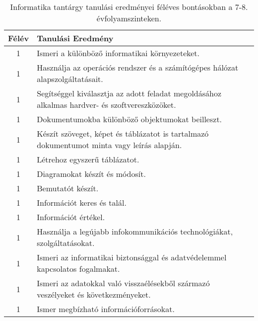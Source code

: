        
           \begin{longtable}{c | p{} }
            \caption[Informatika 7-8.]{Informatika tantárgy tanulási eredményei féléves bontásokban a 7-8. évfolyamszinteken. }  \\

            \textbf{Félév} & \textbf{Tanulási Eredmény} \\
            \hline
            \endhead
                                
                                          1 &  Ismeri a különböző informatikai környezeteket. \\ \hline
                                          1 &  Használja az operációs rendszer és a számítógépes hálózat alapszolgáltatásait. \\ \hline
                                          1 &  Segítséggel kiválasztja az adott feladat megoldásához alkalmas hardver- és szoftvereszközöket. \\ \hline
                                          1 &  Dokumentumokba különböző objektumokat beilleszt. \\ \hline
                                          1 &  Készít szöveget, képet és táblázatot is tartalmazó dokumentumot minta vagy leírás alapján. \\ \hline
                                          1 &  Létrehoz egyszerű táblázatot. \\ \hline
                                          1 &  Diagramokat készít és módosít. \\ \hline
                                          1 &  Bemutatót készít. \\ \hline
                                          1 &  Információt keres és talál. \\ \hline
                                          1 &  Információt értékel. \\ \hline
                                          1 &  Használja a legújabb infokommunikációs technológiákat, szolgáltatásokat. \\ \hline
                                          1 &  Ismeri az informatikai biztonsággal és adatvédelemmel kapcsolatos fogalmakat. \\ \hline
                                          1 &  Ismeri az adatokkal való visszaélésekből származó veszélyeket és következményeket. \\ \hline
                                          1 &  Ismer megbízható információforrásokat. \\ \hline

\end{longtable}
